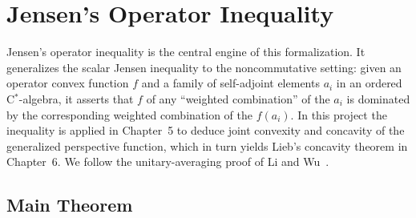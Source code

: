 \chapter{Jensen's Operator Inequality}

Jensen's operator inequality is the central engine of this formalization.
It generalizes the scalar Jensen inequality to the noncommutative setting: given an
operator convex function $f$ and a family of self-adjoint elements $a_i$ in an ordered
C$^*$-algebra, it asserts that $f$ of any ``weighted combination'' of the $a_i$ is
dominated by the corresponding weighted combination of the $f(a_i)$.
In this project the inequality is applied in Chapter~5 to deduce joint convexity and
concavity of the generalized perspective function, which in turn yields Lieb's concavity
theorem in Chapter~6.
We follow the unitary-averaging proof of Li and Wu~\cite{LiWu2012}.

\section{Main Theorem}

